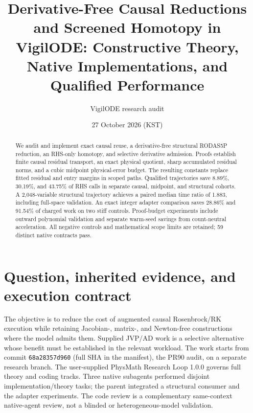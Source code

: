\documentclass[aps,pra,reprint,onecolumn,12pt,notitlepage,superscriptaddress,nofootinbib]{revtex4-2}
\begin{document}
\title{Derivative-Free Causal Reductions and Screened Homotopy in VigilODE:
Constructive Theory, Native Implementations, and Qualified Performance}
\author{VigilODE research audit}
\noaffiliation
\date{27 October 2026 (KST)}
\begin{abstract}
We audit and implement exact causal reuse, a derivative-free structural
RODAS5P reduction, an RHS-only homotopy, and selective derivative admission.
Proofs establish finite causal residual transport, an exact physical quotient,
sharp accumulated residual norms, and a cubic midpoint physical-error budget.
The resulting constants replace fitted residual and entry margins in scoped
paths. Qualified trajectories save 8.89\%, 30.19\%, and 43.75\% of RHS calls
in separate causal, midpoint, and structural cohorts. A 2,048-variable
structural trajectory achieves a paired median time ratio of 1.883, including
full-space validation. An exact integer adapter comparison saves 28.86\%
and 91.54\% of charged work on two stiff controls. Proof-budget experiments
include outward polynomial validation and separate warm-seed savings from
count-neutral acceleration. All negative controls and mathematical scope
limits are retained; 59 distinct native contracts pass.
\end{abstract}
\maketitle

\section{Question, inherited evidence, and execution contract}
The objective is to reduce the cost of augmented causal Rosenbrock/RK
execution while retaining Jacobian-, matrix-, and Newton-free constructions
where the model admits them. Supplied JVP/AD work is a selective alternative
whose benefit must be established in the relevant workload. The work starts
from commit \texttt{68a28357d960} (full SHA in the manifest), the PR90
audit, on a separate research branch. The user-supplied PhysMath Research
Loop 1.0.0 governs full theory and coding tracks. Three native subagents
performed disjoint implementation/theory tasks; the parent integrated a
structural consumer and the adapter experiments. The code review is a
complementary same-context native-agent review, not a blinded or
heterogeneous-model validation.
\end{document}
